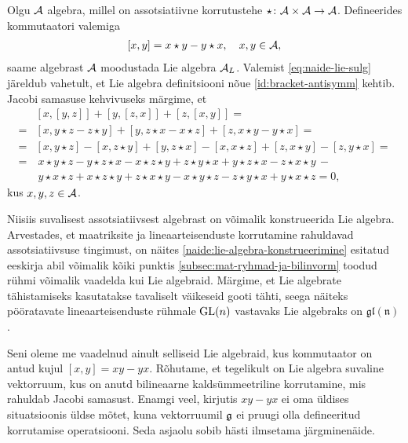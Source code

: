 \begin{naide}\label{naide:lie-algebra-konstrueerimine}
    Olgu $\mathcal{A}$ algebra, millel on assotsiatiivne korrutustehe
    $\star \colon \mathcal{A} \times \mathcal{A} \to \mathcal{A}$. Defineerides kommutaatori valemiga
    \begin{align}\label{eq:naide-lie-sulg}
        [x, y] = x \star y - y \star x,\quad x, y \in \mathcal{A},
    \end{align}
    saame algebrast $\mathcal{A}$ moodustada Lie algebra $\mathcal{A}_L$. Valemist
    \eqref{eq:naide-lie-sulg} järeldub vahetult, et Lie algebra
    definitsiooni nõue \eqref{id:bracket-antisymm} kehtib. Jacobi samasuse
    kehvivuseks märgime, et
    \begin{align*}
        &\left[x, \left[y, z\right]\right] + 
            \left[y, \left[z, x\right]\right] + 
            \left[z, \left[x, y\right]\right] = \\
        =& \left[x, y \star z - z \star y \right] + 
            \left[y, z \star x - x \star z \right] + 
            \left[z, x \star y - y \star x \right] = \\
        =& \left[x, y \star z\right] - \left[x, z \star y\right] + 
            \left[y, z \star x\right] - \left[x, x \star z\right] + 
            \left[z, x \star y\right] - \left[z, y \star x\right] = \\
        =&\ x \star y \star z - y \star z \star x - x \star z \star y +
            z \star y \star x + y \star z \star x - z \star x \star y\, - \\
         &\ y \star x \star z + x \star z \star y + z \star x \star y -
            x \star y \star z - z \star y \star x + y \star x \star z = 0,
    \end{align*}
    kus $x, y, z \in \mathcal{A}$.
\end{naide}

Niisiis suvalisest assotsiatiivsest algebrast on võimalik konstrueerida
Lie algebra. Arvestades, et maatriksite ja lineaarteisenduste korrutamine
rahuldavad assotsiatiivsuse tingimust, on näites
\ref{naide:lie-algebra-konstrueerimine} esitatud eeskirja abil
võimalik kõiki punktis \ref{subsec:mat-ryhmad-ja-bilinvorm} toodud
rühmi võimalik vaadelda kui Lie algebraid. Märgime, et Lie algebrate
tähistamiseks kasutatakse tavaliselt väikeseid gooti tähti, seega näiteks
pööratavate lineaarteisenduste rühmale $\operatorname{GL}(n)$ vastavaks Lie algebraks on
$\mathfrak{gl(n)}$.

Seni oleme me vaadelnud ainult selliseid Lie algebraid, kus kommutaator
on antud kujul $[x, y] = xy - yx$. Rõhutame, et tegelikult on Lie algebra
suvaline vektorruum, kus on anutd bilineaarne kaldsümmeetriline korrutamine,
mis rahuldab Jacobi samasust. Enamgi veel, kirjutis $xy - yx$ ei oma üldises
situatsioonis üldse mõtet, kuna vektorruumil $\mathfrak{g}$ ei pruugi olla defineeritud
korrutamise operatsiooni. Seda asjaolu sobib hästi ilmsetama järgminenäide.

